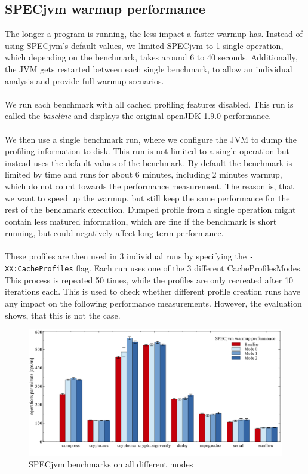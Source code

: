 \subsection{SPECjvm warmup performance}
\label{s:perf_specjvm_warmup}
The longer a program is running, the less impact a faster warmup has. 
Instead of using SPECjvm's default values, we limited SPECjvm to 1 single operation, which depending on the benchmark, takes around 6 to 40 seconds.
Additionally, the JVM gets restarted between each single benchmark, to allow an individual analysis and provide full warmup scenarios.
\\\\
We run each benchmark with all cached profiling features disabled. This run is called the \textit{baseline} and displays the original openJDK 1.9.0 performance.    
\\\\ 
We then use a single benchmark run, where we configure the JVM to dump the profiling information to disk. This run is not limited to a single operation but instead uses the default values of the benchmark. By default the benchmark is limited by time and runs for about 6 minutes, including 2 minutes warmup, which do not count towards the performance measurement. The reason is, that we want to speed up the warmup. but still keep the same performance for the rest of the benchmark execution. Dumped profile from a single operation might contain less matured information, which are fine if the benchmark is short running, but could negatively affect long term performance.
\\\\
These profiles are then used in 3 individual runs by specifying the \texttt{-XX:CacheProfiles} flag. Each run uses one of the 3 different CacheProfilesModes. This process is repeated 50 times, while the profiles are only recreated after 10 iterations each. This is used to check whether different profile creation runs have any impact on the following performance measurements. However, the evaluation shows, that this is not the case.
\begin{figure}[ht]
  \begin{center}
    \centering
    \includegraphics[width=1.0\textwidth]{figures/others_warmup.png}
    \caption{SPECjvm benchmarks on all different modes}
    \label{f:others_warmup}
  \end{center}
\end{figure}
